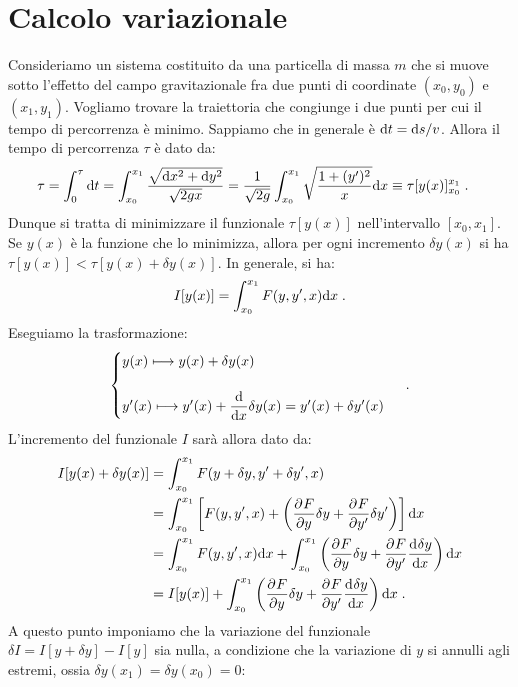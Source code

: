 \section{Calcolo variazionale}
Consideriamo un sistema costituito da una particella di massa $m$ che si muove sotto l'effetto del campo gravitazionale fra due punti di coordinate $(x_0,y_0)$ e $(x_1,y_1)$. Vogliamo trovare la traiettoria che congiunge i due punti per cui il tempo di percorrenza è minimo. Sappiamo che in generale è $\diff[t]=\diff[s]/v$. Allora il tempo di percorrenza $\tau$ è dato da:
\begin{align}
\tau &=\int_0^{\tau}\diff{t}=\int_{x_0}^{x_1}\frac{\sqrt{\diff{x}^2+\diff{y}^2}}{\sqrt{2gx}}=\frac{1}{\sqrt{2g}}\int_{x_0}^{x_1}\sqrt{\frac{1+(y')^2}{x}}\diff{x}\equiv\tau[y(x)]^{x_1}_{x_0}\;.
\end{align}
Dunque si tratta di minimizzare il funzionale $\tau[y(x)]$ nell'intervallo $[x_0,x_1]$. Se $y(x)$ è la funzione che lo minimizza, allora per ogni incremento $\delta y(x)$ si ha $\tau[y(x)]<\tau[y(x)+\delta y(x)]$. In generale, si ha:
\begin{equation}
I[y(x)]=\int_{x_0}^{x_1} F(y,y',x)\diff[x]\;.
\end{equation}
Eseguiamo la trasformazione:
\begin{equation}
\begin{cases}
y(x)\longmapsto y(x)+\delta y(x) \\
\\
y'(x)\longmapsto y'(x)+\dfrac{\diff}{\diff[x]}\delta y(x)=y'(x)+\delta y'(x)
\end{cases}\;.
\end{equation}
L'incremento del funzionale $I$ sarà allora dato da:
\begin{align}
I[y(x)+\delta y(x)]&=\int_{x_0}^{x_1} F(y+\delta y, y'+\delta y',x) \notag \\
&= \int_{x_0}^{x_1} \left[F(y,y',x)+\left(\pdev{F}{y}\delta y+\pdev{F}{y'}\delta y'\right)\right]\diff[x] \notag \\
&= \int_{x_0}^{x_1} F(y,y',x)\diff[x]+\int_{x_0}^{x_1}\left(\pdev{F}{y}\delta y+\pdev{F}{y'}\dev{\delta y}{x}\right)\diff[x] \notag \\
&=I[y(x)]+\int_{x_0}^{x_1} \left(\pdev{F}{y}\delta y+\pdev{F}{y'}\dev{\delta y}{x}\right)\diff[x]\;.
\end{align}
A questo punto imponiamo che la variazione del funzionale $\delta I=I[y+\delta y]-I[y]$ sia nulla, a condizione che la variazione di $y$ si annulli agli estremi, ossia $\delta y(x_1)=\delta y(x_0)=0$:
